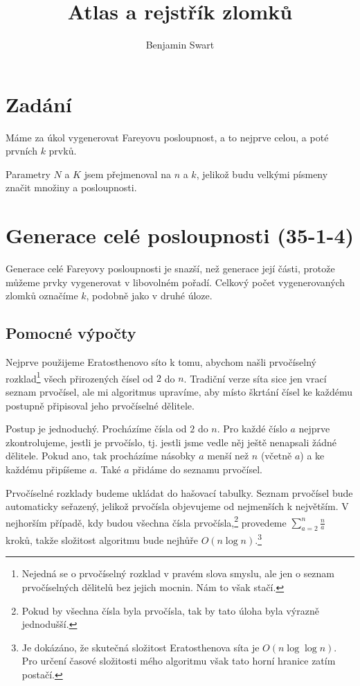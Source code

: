 \documentclass{article}
\title{Atlas a rejstřík zlomků}
\author{Benjamin Swart}
\begin{document}
\maketitle

\section{Zadání}

Máme za úkol vygenerovat Fareyovu posloupnost, a to nejprve celou, a poté prvních $k$ prvků.

Parametry $N$ a $K$ jsem přejmenoval na $n$ a $k$, jelikož budu velkými písmeny značit množiny a posloupnosti.

\section{Generace celé posloupnosti (35-1-4)}

Generace celé Fareyovy posloupnosti je snazší, než generace její části, protože můžeme prvky vygenerovat v libovolném pořadí. Celkový počet vygenerovaných zlomků označíme $k$, podobně jako v druhé úloze.

\subsection{Pomocné výpočty}
\label{section:sieve}

Nejprve použijeme Eratosthenovo síto k tomu, abychom našli prvočíselný rozklad\footnote{Nejedná se o prvočíselný rozklad v pravém slova smyslu, ale jen o seznam prvočíselných dělitelů bez jejich mocnin. Nám to však stačí.} všech přirozených čísel od $2$ do $n$. Tradiční verze síta sice jen vrací seznam prvočísel, ale mi algoritmus upravíme, aby místo škrtání čísel ke každému postupně připisoval jeho prvočíselné dělitele.

Postup je jednoduchý. Procházíme čísla od $2$ do $n$. Pro každé číslo $a$ nejprve zkontrolujeme, jestli je prvočíslo, tj. jestli jsme vedle něj ještě nenapsali žádné dělitele. Pokud ano, tak procházíme násobky $a$ menší než $n$ (včetně $a$) a ke každému připíšeme $a$. Také $a$ přidáme do seznamu prvočísel.

Prvočíselné rozklady budeme ukládat do hašovací tabulky. Seznam prvočísel bude automaticky seřazený, jelikož prvočísla objevujeme od nejmenších k největším. V nejhorším případě, kdy budou všechna čísla prvočísla,\footnote{Pokud by všechna čísla byla prvočísla, tak by tato úloha byla výrazně jednodušší.} provedeme $\sum_{a=2}^{n}{\frac{n}{a}}$ kroků, takže složitost algoritmu bude nejhůře $O\left(n \log{n}\right)$.\footnote{Je dokázáno, že skutečná složitost Eratosthenova síta je $O\left(n \log{\log{n}}\right)$. Pro určení časové složitosti mého algoritmu však tato horní hranice zatím postačí.}
\end{document}
